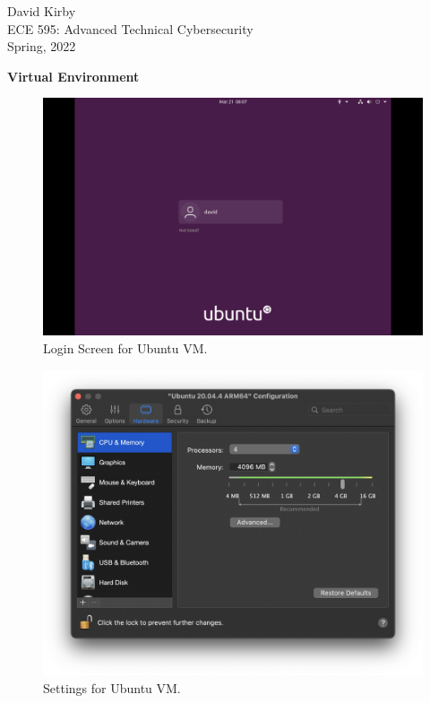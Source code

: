\documentclass[12pt]{article}
\begin{document}
\setmainfont{SF Pro Text}
\setsansfont{SF Pro Text}
\setmonofont{SF Mono}
\renewcommand{\familydefault}{\sfdefault}

\hypersetup{
    linkcolor=CrispBlue,
    urlcolor=CrispBlue,
    breaklinks=true
}

\noindent David Kirby\\
ECE 595: Advanced Technical Cybersecurity\\
Spring, 2022
\begin{center}
    \large\bfseries Virtual Environment
\end{center}

\begin{figure}[!ht]
    \centering
    \includegraphics[width=\textwidth]{figure01.png}
    \caption{Login Screen for Ubuntu VM.}
    \label{fig:login}
\end{figure}

\begin{figure}[!ht]
    \centering
    \includegraphics[width=\textwidth]{figure02.png}\vspace{-1em}
    \caption{Settings for Ubuntu VM.}
    \label{fig:settings}
\end{figure}
\end{document}
